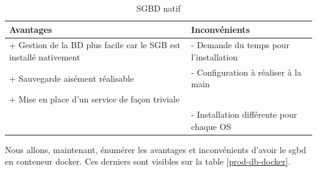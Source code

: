 \documentclass[
    iai, %
    il, %
]{heig-tb}
\begin{document}
\begin{table}[h]
    \begin{center}
        \caption{SGBD natif \label{prod-db-native}}
        \begin{tabularx}{1.0\textwidth} {X|X}
            Avantages                                                         & Inconvénients                            \\ \hline
            + Gestion de la BD plus facile car le SGB est installé nativement & - Demande du temps
            pour l'installation                                                                                          \\
            + Sauvegarde aisément réalisable                                  & - Configuration à réaliser à la main     \\
            + Mise en place d'un service de façon triviale                    &                                          \\
                                                                              & - Installation différente pour chaque OS \\
        \end{tabularx}
    \end{center}
\end{table}

Nous allons, maintenant, énumérer les avantages et inconvénients d'avoir le \Gls{sgbd} en \Gls{conteneur}
\Gls{docker}. Ces derniers sont visibles sur la table \ref{prod-db-docker}.
\end{document}
